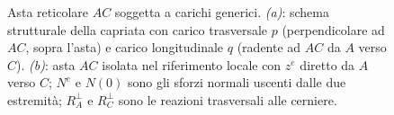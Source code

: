 \begin{figure}[htbp]
{
	}%
	\caption{Asta reticolare $AC$ soggetta a carichi generici.
		\emph{(a)}: schema strutturale della capriata con
		carico trasversale $p$ (perpendicolare ad $AC$,
		sopra l'asta) e carico longitudinale $q$
		(radente ad $AC$ da $A$ verso $C$).
		\emph{(b)}: asta $AC$ isolata nel riferimento locale
		con $z^e$ diretto da $A$ verso $C$;
		$N^e$ e $N(0)$ sono gli sforzi normali uscenti
		dalle due estremità; $R_A^\perp$ e $R_C^\perp$
		sono le reazioni trasversali alle cerniere.}
	\label{fig:asta_caricata}
\end{figure}
